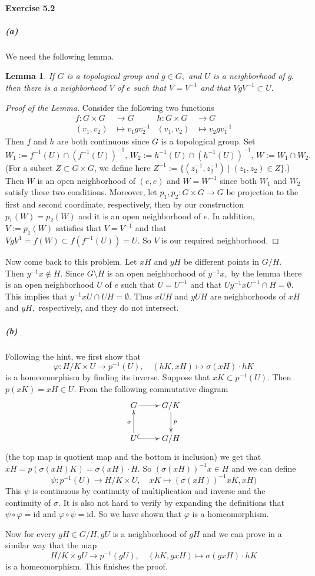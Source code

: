 \documentclass{article}
\newtheorem*{lem}{Lemma}
\begin{document}
\paragraph{Exercise 5.2}
\subparagraph{(a)}We need the following lemma.
\begin{lem}
If $G$ is a topological group and $g\in G,$ and $U$ is a neighborhood of $g,$ then there is a neighborhood $V$ of $e$ such that $V=V^{-1}$ and that $VgV^{-1}\subset U.$
\end{lem}
\begin{proof}[Proof of the Lemma]
  Consider the following two functions
   \begin{align*}
     f\colon G\times G&\rightarrow G & h\colon G\times G&\rightarrow G \\
     (v_1,v_2)&\mapsto v_1gv_2^{-1} & (v_1,v_2)&\mapsto v_2gv_1^{-1}
   \end{align*}
  Then $f$ and $h$ are both continuous since $G$ is a topological group. Set
  \[W_1:=f^{-1}(U)\cap(f^{-1}(U))^{-1},\,W_2:=h^{-1}(U)\cap(h^{-1}(U))^{-1},\,W:=W_1\cap W_2.\]
  (For a subset $Z\subset G\times G$, we define here $Z^{-1}:=\{(z_1^{-1},z_2^{-1})\mid(z_1,z_2)\in Z\}.$) Then $W$ is an open neighborhood of $(e,e)$ and $W=W^{-1}$ since both $W_1$ and $W_2$ satisfy these two conditions. Moreover, let $p_1,p_2\colon G\times G\rightarrow G$ be projection to the first and second coordinate, respectively, then by our construction $p_1(W)=p_2(W)$ and it is an open neighborhood of $e.$ In addition, $V:=p_1(W)$ satisfies that $V=V^{-1}$ and that $VgV^{1}=f(W)\subset f(f^{-1}(U))=U.$ So $V$ is our required neighborhood.
\end{proof}

Now come back to this problem. Let $xH$ and $yH$ be different points in $G/H.$ Then $y^{-1}x\notin H.$ Since $G\setminus H$ is an open neighborhood of $y^{-1}x,$ by the lemma there is an open neighborhood $U$ of $e$ such that $U=U^{-1}$ and that $Uy^{-1}xU^{-1}\cap H=\emptyset.$ This implies that $y^{-1}xU\cap UH=\emptyset.$ Thus $xUH$ and $yUH$ are neighborhoods of $xH$ and $yH,$ respectively, and they do not intersect.

\subparagraph{(b)}
Following the hint, we first show that
\[\varphi\colon H/K\times U\rightarrow p^{-1}(U),\quad(hK,xH)\mapsto\sigma(xH)\cdot hK\]
is a homeomorphism by finding its inverse. Suppose that $xK\subset p^{-1}(U).$ Then $p(xK)=xH\in U.$ From the following commutative diagram
\[\xymatrix{
G\ar[r] & G/K\ar[d]^{p}\\
U\ar[u]^{\sigma}\ar@{^(->}[r] & G/H
}\]
(the top map is quotient map and the bottom is inclusion) we get that $xH=p(\sigma(xH)K)=\sigma(xH)\cdot H.$ So $(\sigma(xH))^{-1}x\in H$ and we can define
\[\psi\colon p^{-1}(U)\rightarrow H/K\times U,\quad xK\mapsto(\sigma(xH))^{-1}xK,xH) \]
This $\psi$ is continuous by continuity of multiplication and inverse and the continuity of $\sigma.$ It is also not hard to verify by expanding the definitions that $\psi\circ\varphi=\text{id}$ and $\varphi\circ\psi=\text{id}.$ So we have shown that $\varphi$ is a homeomorphism.

Now for every $gH\in G/H,gU$ is a neighborhood of $gH$ and we can prove in a similar way that the map
\[H/K\times gU\rightarrow p^{-1}(gU),\quad(hK,gxH)\mapsto\sigma(gxH)\cdot hK\]
is a homeomorphism. This finishes the proof.
\end{document}
